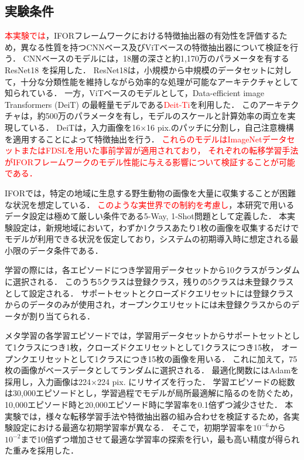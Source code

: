 \documentclass[a4paper,11pt,nomag]{jsreport}
\begin{document}
\subsection{実験条件}

\textcolor{red}{本実験では}，IFORフレームワークにおける特徴抽出器の有効性を評価するため，異なる性質を持つCNNベース及びViTベースの特徴抽出器について検証を行う．
CNNベースのモデルには，18層の深さと約1,170万のパラメータを有するResNet18 \cite{resnet}を採用した．
ResNet18は，小規模から中規模のデータセットに対して，十分な分類性能を維持しながら効率的な処理が可能なアーキテクチャとして知られている．
一方，ViTベースのモデルとして，Data-efficient image Transformers (DeiT) \cite{deit} の最軽量モデルである\textcolor{red}{Deit-Ti}を利用した．
このアーキテクチャは，約500万のパラメータを有し，モデルのスケールと計算効率の両立を実現している．
DeiTは，入力画像を16$\times$16 pix.のパッチに分割し，自己注意機構を適用することによって特徴抽出を行う．
\textcolor{red}{これらのモデルはImageNetデータセットまたはFDSLを用いた事前学習が適用されており，
それぞれの転移学習手法がIFORフレームワークのモデル性能に与える影響について検証することが可能である．}

IFORでは，特定の地域に生息する野生動物の画像を大量に収集することが困難な状況を想定している．
\textcolor{red}{このような実世界での制約を考慮し}，本研究で用いるデータ設定は極めて厳しい条件である5-Way, 1-Shot問題として定義した．
本実験設定は，新規地域において，わずか1クラスあたり1枚の画像を収集するだけでモデルが利用できる状況を仮定しており，システムの初期導入時に想定される最小限のデータ条件である．

学習の際には，各エピソードにつき学習用データセットから10クラスがランダムに選択される．
このうち5クラスは登録クラス，残りの5クラスは未登録クラスとして設定される．
サポートセットとクローズドクエリセットには登録クラスからのデータのみが使用され，オープンクエリセットには未登録クラスからのデータが割り当てられる．

メタ学習の各学習エピソードでは，学習用データセットからサポートセットとして1クラスにつき1枚，クローズドクエリセットとして1クラスにつき15枚，
オープンクエリセットとして1クラスにつき15枚の画像を用いる．
これに加えて，75枚の画像がベースデータとしてランダムに選択される．
最適化関数にはAdamを採用し，入力画像は224$\times$224 pix. にリサイズを行った．
学習エピソードの総数は30,000エピソードとし，学習過程でモデルが局所最適解に陥るのを防ぐため，10,000エピソード時と20,000エピソード時に学習率を0.1倍ずつ減少させた．
本実験では，様々な転移学習手法や特徴抽出器の組み合わせを検証するため，各実験設定における最適な初期学習率が異なる．
そこで，初期学習率を$10^{-6}$から$10^{-2}$まで10倍ずつ増加させて最適な学習率の探索を行い，最も高い精度が得られた重みを採用した．
\end{document}

